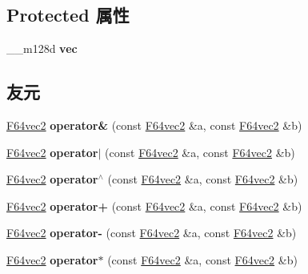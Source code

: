 \subsection*{Protected 属性}
\begin{DoxyCompactItemize}
\item 
\mbox{\label{class_f64vec2_aa50ade0b1860b89d21a4bcc00adb23c0}} 
\+\_\+\+\_\+m128d {\bfseries vec}
\end{DoxyCompactItemize}
\subsection*{友元}
\begin{DoxyCompactItemize}
\item 
\mbox{\label{class_f64vec2_a7249188a56867e4d1b16c0bf7b67b6fa}} 
\hyperlink{class_f64vec2}{F64vec2} {\bfseries operator\&} (const \hyperlink{class_f64vec2}{F64vec2} \&a, const \hyperlink{class_f64vec2}{F64vec2} \&b)
\item 
\mbox{\label{class_f64vec2_a8cfbd3455a6d66919f33cb8e2c460ac2}} 
\hyperlink{class_f64vec2}{F64vec2} {\bfseries operator$\vert$} (const \hyperlink{class_f64vec2}{F64vec2} \&a, const \hyperlink{class_f64vec2}{F64vec2} \&b)
\item 
\mbox{\label{class_f64vec2_accd6fed81a261a533189caabcc31d242}} 
\hyperlink{class_f64vec2}{F64vec2} {\bfseries operator$^\wedge$} (const \hyperlink{class_f64vec2}{F64vec2} \&a, const \hyperlink{class_f64vec2}{F64vec2} \&b)
\item 
\mbox{\label{class_f64vec2_a67589f342ba4a5e2f9c8fcafb819f930}} 
\hyperlink{class_f64vec2}{F64vec2} {\bfseries operator+} (const \hyperlink{class_f64vec2}{F64vec2} \&a, const \hyperlink{class_f64vec2}{F64vec2} \&b)
\item 
\mbox{\label{class_f64vec2_a3573ae609281fa1be99a5019fc947611}} 
\hyperlink{class_f64vec2}{F64vec2} {\bfseries operator-\/} (const \hyperlink{class_f64vec2}{F64vec2} \&a, const \hyperlink{class_f64vec2}{F64vec2} \&b)
\item 
\mbox{\label{class_f64vec2_a0d6e49f131c2318e7a122658672abcdd}} 
\hyperlink{class_f64vec2}{F64vec2} {\bfseries operator$\ast$} (const \hyperlink{class_f64vec2}{F64vec2} \&a, const \hyperlink{class_f64vec2}{F64vec2} \&b)

\end{DoxyCompactItemize}

